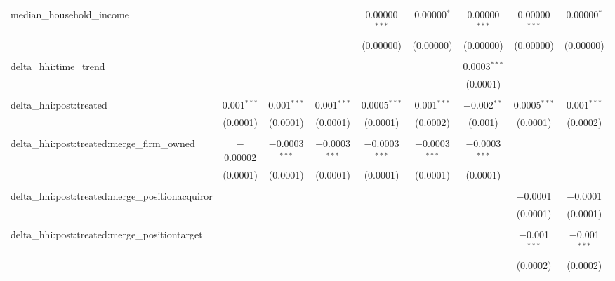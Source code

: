 \begin{table}[H]
{\begin{tabular}{@{\extracolsep{5pt}}lcccccccc}
  median\_household\_income &  &  &  & 0.00000$^{***}$ & 0.00000$^{*}$ & 0.00000$^{***}$ & 0.00000$^{***}$ & 0.00000$^{*}$ \\  

   &  &  &  & (0.00000) & (0.00000) & (0.00000) & (0.00000) & (0.00000) \\  

   & & & & & & & & \\  

  delta\_hhi:time\_trend &  &  &  &  &  & 0.0003$^{***}$ &  &  \\  

   &  &  &  &  &  & (0.0001) &  &  \\  

   & & & & & & & & \\  

  delta\_hhi:post:treated & 0.001$^{***}$ & 0.001$^{***}$ & 0.001$^{***}$ & 0.0005$^{***}$ & 0.001$^{***}$ & $-$0.002$^{**}$ & 0.0005$^{***}$ & 0.001$^{***}$ \\  

   & (0.0001) & (0.0001) & (0.0001) & (0.0001) & (0.0002) & (0.001) & (0.0001) & (0.0002) \\  

   & & & & & & & & \\  

  delta\_hhi:post:treated:merge\_firm\_owned & $-$0.00002 & $-$0.0003$^{***}$ & $-$0.0003$^{***}$ & $-$0.0003$^{***}$ & $-$0.0003$^{***}$ & $-$0.0003$^{***}$ &  &  \\  

   & (0.0001) & (0.0001) & (0.0001) & (0.0001) & (0.0001) & (0.0001) &  &  \\  

   & & & & & & & & \\  

  delta\_hhi:post:treated:merge\_positionacquiror &  &  &  &  &  &  & $-$0.0001 & $-$0.0001 \\  

   &  &  &  &  &  &  & (0.0001) & (0.0001) \\  

   & & & & & & & & \\  

  delta\_hhi:post:treated:merge\_positiontarget &  &  &  &  &  &  & $-$0.001$^{***}$ & $-$0.001$^{***}$ \\  

   &  &  &  &  &  &  & (0.0002) & (0.0002) \\  


\end{tabular}}
\end{table}
